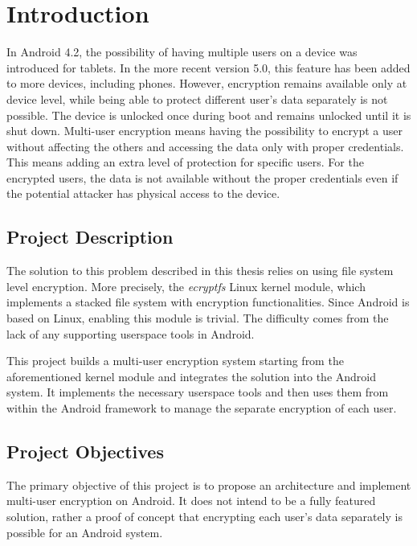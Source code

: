 \chapter{Introduction}
\label{chapter:intro}

In Android 4.2, the possibility of having multiple users on a device was introduced for tablets\cite{and-42}. In the more recent version 5.0, this feature has been added to more devices, including phones\cite{and-50}. However, encryption remains available only at device level, while being able to protect different user's data separately is not possible. The device is unlocked once during boot and remains unlocked until it is shut down. Multi-user encryption means having the possibility to encrypt a user without affecting the others and accessing the data only with proper credentials. This means adding an extra level of protection for specific users. For the encrypted users, the data is not available without the proper credentials even if the potential attacker has physical access to the device. 

\section{Project Description}
\label{sec:proj-desc-intro}

The solution to this problem described in this thesis relies on using file system level encryption. More precisely, the \textit{ecryptfs} Linux kernel module, which implements a stacked file system with encryption functionalities. Since Android is based on Linux, enabling this module is trivial. The difficulty comes from the lack of any supporting userspace tools in Android.

This project builds a multi-user encryption system starting from the aforementioned kernel module and integrates the solution into the Android system. It implements the necessary userspace tools and then uses them from within the Android framework to manage the separate encryption of each user.

\section{Project Objectives}
\label{sec:proj-objs-intro}

The primary objective of this project is to propose an architecture and implement multi-user encryption on Android. It does not intend to be a fully featured solution, rather a proof of concept that encrypting each user's data separately is possible for an Android system.

